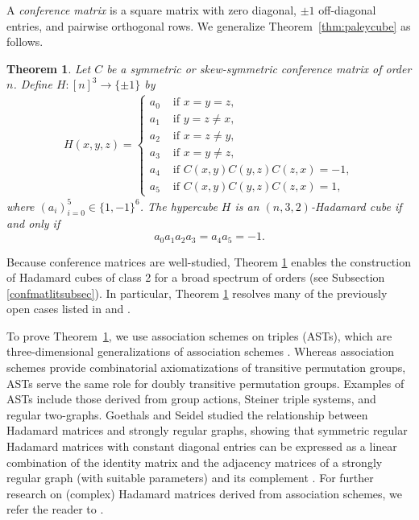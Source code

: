 \documentclass[11pt,oneside]{amsart}
\newcommand{\defn}[1]{\textit{#1}}
\newtheorem{thm}{Theorem}
\begin{document}
A \defn{conference matrix} is a square matrix with zero diagonal, $\pm 1$ off-diagonal entries, and pairwise orthogonal rows. We generalize  Theorem~\ref{thm:paleycube} as follows.
\begin{thm}\label{thm:main1}
Let $C$ be a symmetric or skew-symmetric conference matrix of order $n$. 
Define $H:[n]^3\rightarrow \{\pm 1\}$ by 
\begin{align*}
    H(x,y,z)=\begin{cases}
    a_0 & \text{ if }x=y=z,\\
    a_1 & \text{ if }y=z\neq x,\\
    a_2 & \text{ if }x=z\neq y,\\
    a_3 & \text{ if }x=y\neq z,\\
    a_4 & \text{ if }C(x,y) C(y,z) C(z,x)=-1,\\
    a_5 & \text{ if }C(x,y) C(y,z) C(z,x)=1, 
    \end{cases}
\end{align*}
 where $(a_i)_{i=0}^{5}\in\{1,-1\}^6$. The hypercube $H$ is an $(n,3,2)$-Hadamard cube if and only if $$a_0a_1a_2a_3=a_4a_5=-1.$$  
\end{thm}
Because conference matrices are well-studied, Theorem \ref{thm:main1} enables the construction of Hadamard cubes of class 2 for a broad spectrum of orders (see Subsection \ref{confmatlitsubsec}). In particular, Theorem \ref{thm:main1} resolves many of the previously open cases listed in \cite{YangNiuXu2010_HigherDimHadamard} and \cite[Problem 2]{MR4885925}.

   
To prove Theorem~\ref{thm:main1}, we use association schemes on triples (ASTs), which are three-dimensional generalizations of association schemes \cite{MR1075708}. Whereas association schemes provide combinatorial axiomatizations of transitive permutation groups, ASTs serve the same role for doubly transitive permutation groups. Examples of ASTs include those derived from group actions, Steiner triple systems, and regular two-graphs. Goethals and Seidel studied the relationship between Hadamard matrices and strongly regular graphs, showing that symmetric regular Hadamard matrices with constant diagonal entries can be expressed as a linear combination of the identity matrix and the adjacency matrices of a strongly regular graph (with suitable parameters) and its complement \cite[Theorem~4.2]{MR0282872}. For further research on (complex) Hadamard matrices derived from association schemes, we refer the reader to \cite{Chan2011ComplexSRG,Chan2020ComplexHadamard,FenderKharaghaniSuda2018,GOLDBACH1998943,IkutaMunemasa2015BoseMesner,IkutaMunemasa2018BUTSON,IkutaMunemasa20193Class,KHARAGHANI201672}. %
\end{document}
